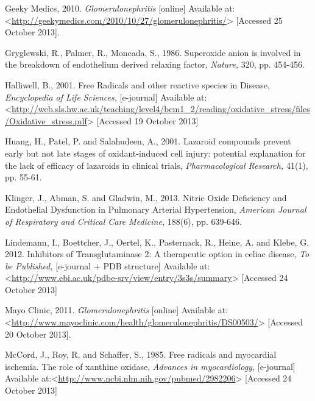 \documentclass[11pt]{report}
\begin{document}
Geeky Medics, 2010. \textit{Glomerulonephritis} [online] Available at: <\url{http://geekymedics.com/2010/10/27/glomerulonephritis/}> [Accessed 25 October 2013].
\newline
\newline

Gryglewski, R., Palmer, R., Moncada, S., 1986. Superoxide anion is involved in the break­down of endothelium derived relaxing factor, \textit{Nature,} 320, pp. 454-456.
\newline
\newline

Halliwell, B., 2001. Free Radicals and other reactive species in Disease, \textit{Encyclopedia of Life Sciences,} [e-journal] Available at:<\url{http://web.sls.hw.ac.uk/teaching/level4/bcm1_2/reading/oxidative_stress/files/Oxidative_stress.pdf}> [Accessed 19 October 2013]
\newline
\newline

Huang, H., Patel, P. and Salahudeen, A., 2001. Lazaroid compounds prevent early but not late stages of oxidant-induced cell injury: potential explanation for the lack of efficacy of lazaroids in clinical trials, \textit{Pharmacological Research,} 41(1), pp. 55-61.
\newline
\newline

Klinger, J., Abman, S. and Gladwin, M., 2013. Nitric Oxide Deficiency and Endothelial Dysfunction in Pulmonary Arterial Hypertension, \textit{American Journal of Respiratory and Critical Care Medicine,} 188(6), pp. 639-646.
\newline
\newline

Lindemann, I., Boettcher, J., Oertel, K., Pasternack, R., Heine, A. and Klebe, G. 2012. Inhibitors of Transglutaminase 2: A therapeutic option in celiac disease, \textit{To be Published,} [e-journal + PDB structure] Available at:<\url{http://www.ebi.ac.uk/pdbe-srv/view/entry/3s3s/summary}> [Accessed 24 October 2013]
\newline
\newline

Mayo Clinic, 2011. \textit{Glomerulonephritis} [online] Available at: <\url{http://www.mayoclinic.com/health/glomerulonephritis/DS00503/}> [Accessed 20 October 2013].
\newline
\newline

McCord, J., Roy, R. and Schaffer, S., 1985. Free radicals and myocardial ischemia. The role of xanthine oxidase, \textit{Advances in myocardiology,} [e-journal] Available at:<\url{http://www.ncbi.nlm.nih.gov/pubmed/2982206}> [Accessed 24 October 2013]
\newline
\newline
\end{document}
